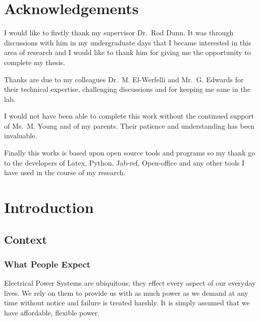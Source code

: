 \documentclass[a4paper,oneside,12pt]{report}
\newcommand{\mainmatter}{\cleardoublepage\pagenumbering{arabic}}
\begin{document}
\chapter*{Acknowledgements}

I would like to firstly thank my supervisor Dr.~Rod Dunn. It was through discussions with him in my undergraduate days that I became interested in this area of research and I would like to thank him for giving me the opportunity to complete my thesis.

Thanks are due to my colleagues Dr.~M. El-Werfelli and Mr.~G. Edwards for their technical expertise, challenging discussions and for keeping me sane in the lab.

I would not have been able to complete this work without the continued support of Ms.~M. Young and of my parents. Their patience and understanding has been invaluable.

Finally this works is based upon open source tools and programs so my thank go to the developers of Latex, Python, Jab-ref, Open-office and any other tools I have used in the course of my research.



\mainmatter



\chapter{Introduction}

\section{Context}
\subsection{What People Expect}

Electrical Power Systems are ubiquitous; they effect every aspect of our everyday lives. We rely on them to provide us with as much power as we demand at any time without notice and failure is treated harshly. It is simply assumed that we have affordable, flexible power.
\end{document}
